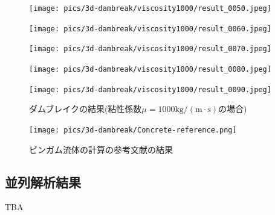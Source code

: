\begin{figure}[H]
	\centering
	\begin{minipage}[b]{0.19\columnwidth}
	    \centering
	    \texttt{[image: pics/3d-dambreak/viscosity1000/result\_0050.jpeg]}
	\end{minipage}
	\begin{minipage}[b]{0.19\columnwidth}
	    \centering
	    \texttt{[image: pics/3d-dambreak/viscosity1000/result\_0060.jpeg]}
	\end{minipage}
	\begin{minipage}[b]{0.19\columnwidth}
	    \centering
	    \texttt{[image: pics/3d-dambreak/viscosity1000/result\_0070.jpeg]}
	\end{minipage}
	\begin{minipage}[b]{0.19\columnwidth}
	    \centering
	    \texttt{[image: pics/3d-dambreak/viscosity1000/result\_0080.jpeg]}
	\end{minipage}
	\begin{minipage}[b]{0.19\columnwidth}
	    \centering
	    \texttt{[image: pics/3d-dambreak/viscosity1000/result\_0090.jpeg]}
	\end{minipage}
	\caption{ダムブレイクの結果(粘性係数$\mu = 1000 \mathrm{kg/(m\cdot s)}$の場合)}
	\label{fig:dambreak-result-visc1000}
\end{figure}


\begin{figure}[H]
	\centering
	\texttt{[image: pics/3d-dambreak/Concrete-reference.png]}
	\caption{ビンガム流体の計算の参考文献の結果\cite{Saito2012}}
	\label{fig:3d-dambreak-concrete-reference}
\end{figure}


\subsection{並列解析結果}
TBA


